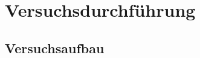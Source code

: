 \section{Versuchsdurchführung}
\label{sec:durchfuehrung}
\subsection{Versuchsaufbau}
\label{sec:aufbau}


